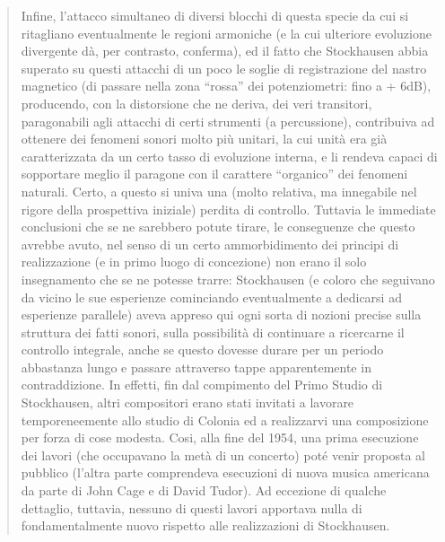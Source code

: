 \begin{quote}
Infine, l’attacco simultaneo di diversi blocchi di questa specie da cui si ritagliano eventualmente le regioni armoniche (e la cui ulteriore evoluzione divergente dà, per contrasto, conferma), ed il fatto che Stockhausen abbia superato su questi attacchi di un poco le soglie di registrazione del nastro magnetico (di passare nella zona “rossa” dei potenziometri: fino a + 6dB), producendo, con la distorsione che ne deriva, dei veri transitori, paragonabili agli attacchi di certi strumenti (a percussione), contribuiva ad ottenere dei fenomeni sonori molto più unitari, la cui unità era già caratterizzata da un certo tasso di evoluzione interna, e li rendeva capaci di sopportare meglio il paragone con il carattere “organico” dei fenomeni naturali. Certo, a questo si univa una (molto relativa, ma innegabile nel rigore della prospettiva iniziale) perdita di controllo. Tuttavia le immediate conclusioni che se ne sarebbero potute tirare, le conseguenze che questo avrebbe avuto, nel senso di un certo ammorbidimento dei principi di realizzazione (e in primo luogo di concezione) non erano il solo insegnamento che se ne potesse trarre: Stockhausen (e coloro che seguivano da vicino le sue esperienze cominciando eventualmente a dedicarsi ad esperienze parallele) aveva appreso qui ogni sorta di nozioni precise sulla struttura dei fatti sonori, sulla possibilità di continuare a ricercarne il controllo integrale, anche se questo dovesse durare per un periodo abbastanza lungo e passare attraverso tappe apparentemente in contraddizione.
In effetti, fin dal compimento del Primo Studio di Stockhausen, altri compositori erano stati invitati a lavorare temporeneemente allo studio di Colonia ed a realizzarvi una composizione per forza di cose modesta. Cosi, alla fine del 1954, una prima esecuzione dei lavori (che occupavano la metà di un concerto) poté venir proposta al pubblico (l’altra parte comprendeva esecuzioni di nuova musica americana da parte di John Cage e di David Tudor). Ad eccezione di qualche dettaglio, tuttavia, nessuno di questi lavori apportava nulla di fondamentalmente nuovo rispetto alle realizzazioni di Stockhausen.


\end{quote}
